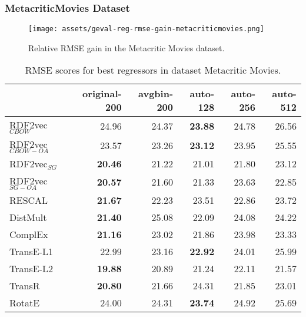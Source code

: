 \documentclass[11pt,titlepage,oneside,openany]{book}
\begin{document}
\newpage

\subsubsection{MetacriticMovies Dataset}
\label{subsubsec:geval-results-reg-metacriticmovies}

\begin{figure}[H]
    \centering
    \texttt{[image: assets/geval-reg-rmse-gain-metacriticmovies.png]}
    \vspace*{-3mm}
    \caption{Relative RMSE gain in the Metacritic Movies dataset.}
    \label{fig:geval-reg-rmse-gain-metacriticmovies}
\end{figure}


\begin{table}[H]
\centering
\begin{tabular}{lrrrrr}
\toprule
{} &  original-200 &  avgbin-200 &  auto-128 &  auto-256 &  auto-512 \\
\midrule
RDF2vec$_{CBOW}$     &         24.96  &       24.37  &	\textbf{23.88} &     24.78  &     26.56  \\
RDF2vec$_{CBOW-OA}$  &         23.57  &       23.26  &	\textbf{23.12} &     23.95  &     25.55  \\
RDF2vec$_{SG}$       &	\textbf{20.46} &       21.22  &     21.01  &     21.80  &     23.12  \\
RDF2vec$_{SG-OA}$    &	\textbf{20.57} &       21.60  &     21.33  &     23.63  &     22.85  \\
RESCAL               &	\textbf{21.67} &       22.23  &     23.51  &     22.86  &     23.72  \\
DistMult             &	\textbf{21.40} &       25.08  &     22.09  &     24.08  &     24.22  \\
ComplEx              &	\textbf{21.16} &       23.02  &     21.86  &     23.98  &     23.33  \\
TransE-L1            &         22.99  &       23.16  &	\textbf{22.92} &     24.01  &     25.99  \\
TransE-L2            &	\textbf{19.88} &       20.89  &     21.24  &     22.11  &     21.57  \\
TransR               &	\textbf{20.80} &       21.66  &     24.31  &     21.85  &     23.01  \\
RotatE               &         24.00  &       24.31  &	\textbf{23.74} &     24.92  &     25.69  \\
\bottomrule
\end{tabular}
\caption{RMSE scores for best regressors in dataset Metacritic Movies.}
\label{tab:geval-reg-rmse-metacriticmovies}
\end{table}
\end{document}
